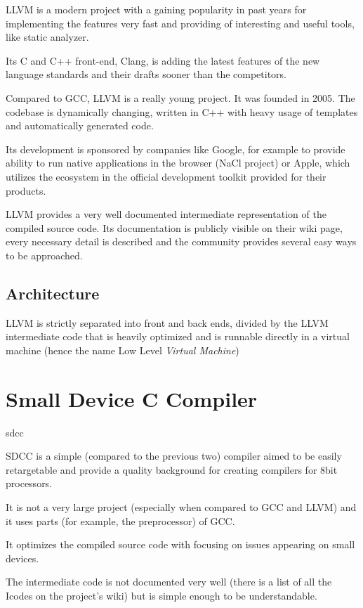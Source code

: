     LLVM is a modern project with a gaining popularity in past years for implementing the features very fast and providing of interesting and useful tools, like static analyzer.

    Its C and C++ front-end, Clang, is adding the latest features of the new language standards and their drafts sooner than the competitors.

    Compared to GCC, LLVM is a really young project. It was founded in 2005. The codebase is dynamically changing, written in C++ with heavy usage of templates and automatically generated code.

    Its development is sponsored by companies like Google, for example to provide ability to run native applications in the browser (NaCl project) or Apple, which utilizes the ecosystem in the official development toolkit provided for their products.

    LLVM provides a very well documented intermediate representation of the compiled source code. Its documentation is publicly visible on their wiki page, every necessary detail is described and the community provides several easy ways to be approached.

        \subsection{Architecture}

        LLVM is strictly separated into front and back ends, divided by the LLVM intermediate code that is heavily optimized and is runnable directly in a virtual machine (hence the name Low Level \emph{Virtual Machine})

    \section{Small Device C Compiler}{sdcc}

    SDCC is a simple (compared to the previous two) compiler aimed to be easily retargetable and provide a quality background for creating compilers for 8bit processors.

    It is not a very large project (especially when compared to GCC and LLVM) and it uses parts (for example, the preprocessor) of GCC.

    It optimizes the compiled source code with focusing on issues appearing on small devices.

    The intermediate code is not documented very well (there is a list of all the Icodes on the project's wiki) but is simple enough to be understandable.

